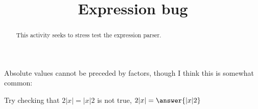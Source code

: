 \documentclass[handout]{ximera}
\title{Expression bug}
\begin{document}
\begin{abstract} This activity seeks to stress test the expression parser.
\end{abstract}


\maketitle

\begin{problem}
Absolute values cannot be preceded by factors, though I think this is somewhat common:

Try checking that $ 2|x| = |x|2$ is not true, $ 2|x| = \answer{|x|2}$
\end{problem}
\end{document}
